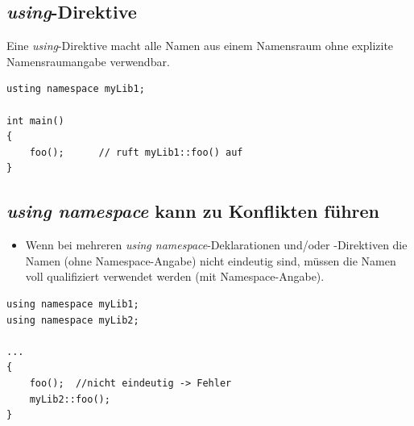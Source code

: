 \subsection{\emph{using}-Direktive}
\vspace{-\baselineskip}
\begin{minipage}{0.5\linewidth}
	Eine \emph{using}-Direktive macht alle Namen aus einem Namensraum ohne explizite Namensraumangabe verwendbar.
\end{minipage}%
\hspace{0.04\linewidth}
\begin{minipage}{0.45\linewidth}
\begin{lstlisting}
usting namespace myLib1;

int main()
{
	foo();		// ruft myLib1::foo() auf
}
\end{lstlisting}
\end{minipage}

\subsection{\emph{using namespace} kann zu Konflikten führen}
\vspace{-\baselineskip}
\begin{minipage}{0.5\linewidth}
\begin{itemize}
	\item Wenn bei mehreren \emph{using namespace}-Deklarationen und/oder -Direktiven die Namen (ohne Namespace-Angabe) nicht eindeutig sind, müssen die Namen voll qualifiziert verwendet werden (mit Namespace-Angabe).
\end{itemize}
\end{minipage}%
\hspace{0.04\linewidth}
\begin{minipage}{0.45\linewidth}
\begin{lstlisting}
using namespace myLib1;
using namespace myLib2;

...
{
	foo();	//nicht eindeutig -> Fehler
	myLib2::foo();
}
\end{lstlisting}
\end{minipage}

